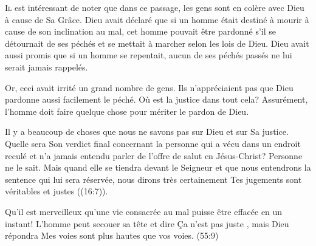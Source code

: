 \dvrule







\lettrine{I}{l} est intéressant de noter que dans ce passage,
 les gens sont en colère avec Dieu à cause de Sa Grâce.
 Dieu avait déclaré que si un homme était destiné à mourir
 à cause de son inclination au mal, cet homme pouvait être pardonné
 s'il se détournait de ses péchés et se mettait à marcher
 selon les lois de Dieu. Dieu avait aussi promis que si un homme se repentait,
 aucun de ses péchés passés ne lui serait jamais rappelés.

Or, ceci avait irrité un grand nombre de gens. Ils n'appréciaient pas que Dieu
 pardonne aussi facilement le péché. Où est la justice dans tout cela?
 Assurément, l'homme doit faire quelque chose pour mériter le pardon de Dieu. 

Il y a beaucoup de choses que nous ne savons pas sur Dieu et sur Sa justice.
 Quelle sera Son verdict final concernant la personne qui a vécu
 dans un endroit reculé et n'a jamais entendu parler de l'offre de salut
 en Jésus-Christ? Personne ne le sait. Mais quand elle se tiendra
 devant le Seigneur et que nous entendrons la sentence qui lui sera réservée,
 nous dirons très certainement\frcolon{} 
 \Og Tes jugements sont véritables et justes \Fg{} ((16:7)). 



Qu'il est merveilleux qu'une vie consacrée au mal puisse être effacée
 en un instant! L'homme peut secouer sa tête et dire\frcolon{} 
 \Og Ça n'est pas juste \Fg{}, mais Dieu répondra\frcolon{} 
 \Og Mes voies sont plus hautes que vos voies. \Fg{}
 (55:9)

